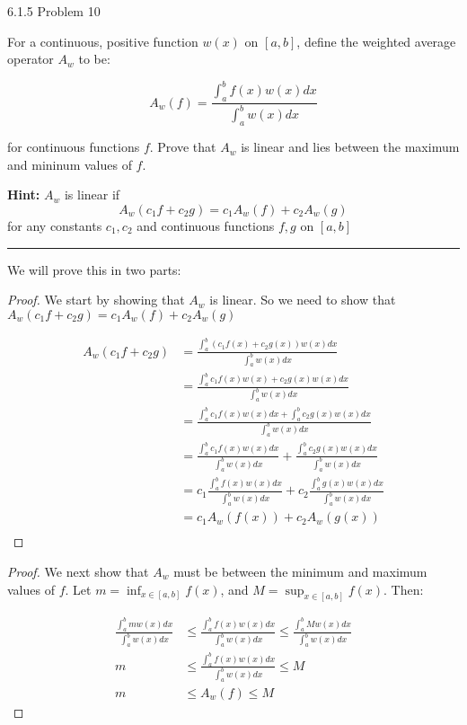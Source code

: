 \documentclass[11pt]{article}
\begin{document}
 6.1.5 Problem 10

For a continuous, positive function $w(x)$ on $[a,b]$, define the weighted average operator $A_w$ to be:

$$A_w(f) = \frac{ \int_a ^b f(x) w(x) dx }{ \int_a ^b w(x) dx}$$

for continuous functions $f$. Prove that $A_w$ is linear and lies between the maximum and mininum values of $f$.

\textbf{Hint:} $A_w$ is linear if
$$A_w (c_1 f + c_2 g) = c_1 A_w (f) + c_2 A_w (g)$$
for any constants $c_1, c_2$ and continuous functions $f,g$ on $[a,b]$
\hrule

We will prove this in two parts: 
\begin{proof}
    We start by showing that $A_w$ is linear. 
    So we need to show that $A_w(c_1 f + c_2 g) = c_1 A_w(f) + c_2 A_w(g)$

    \begin{align*}
        A_w(c_1 f + c_2 g) &= \frac{ \int_a ^b (c_1 f(x) + c_2 g(x)) w(x) dx }{ \int_a ^b w(x) dx}\\
        &= \frac{ \int_a ^b c_1 f(x) w(x) + c_2 g(x) w(x) dx }{ \int_a ^b w(x) dx} \\
        &= \frac{ \int_a ^b c_1 f(x) w(x) dx + \int_a ^b c_2 g(x) w(x) dx }{ \int_a ^b w(x) dx} \\
        &= \frac{ \int_a ^b c_1 f(x) w(x) dx}{ \int_a ^b w(x) dx} + \frac{\int_a ^b c_2 g(x) w(x) dx }{ \int_a ^b w(x) dx} \\
        &= c_1 \frac{ \int_a ^b f(x) w(x) dx}{ \int_a ^b w(x) dx} + c_2 \frac{\int_a ^b g(x) w(x) dx }{ \int_a ^b w(x) dx} \\
        &= c_1 A_w(f(x)) + c_2 A_w(g(x)) \\
    \end{align*}
\end{proof}

\begin{proof}
    We next show that $A_w$ must be between the minimum and maximum values of $f$. 
    Let $m = \inf_{x \in [a,b]} f(x)$, and $M = \sup_{x \in [a,b]} f(x)$. Then:

    \begin{align*}
        \frac{ \int_a ^b m w(x) dx }{ \int_a ^b w(x) dx} &\leq \frac{ \int_a ^b f(x) w(x) dx }{ \int_a ^b w(x) dx} \leq \frac{ \int_a ^b M w(x) dx }{ \int_a ^b w(x) dx}\\
        m &\leq \frac{ \int_a ^b f(x) w(x) dx }{ \int_a ^b w(x) dx} \leq M\\
        m &\leq A_w(f) \leq M
    \end{align*}
    $$$$




\end{proof}
\end{document}
